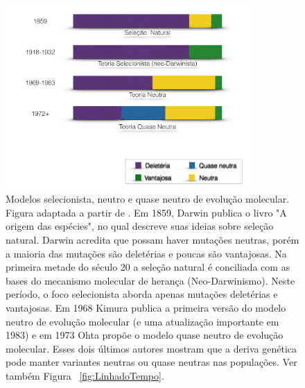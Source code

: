 \begin{refsection}
\begin{figure}[h]
\centering
\includegraphics[height=7cm,keepaspectratio]{chap1_folder/Figures/proportion_mutations.png}
\caption{Modelos selecionista, neutro e quase neutro de evolução molecular. Figura adaptada a partir de \textcite{Bromham2003,Bernardi2007}. Em 1859, Darwin publica o livro "A origem das espécies", no qual descreve suas ideias sobre seleção natural\nocite{Darwin1979}. Darwin acredita que possam haver mutações neutras,  porém a maioria das mutações são deletérias e poucas são vantajosas. Na primeira metade do século 20 a seleção natural é conciliada com as bases do mecanismo molecular de herança (Neo-Darwinismo). Neste período, o foco selecionista aborda apenas mutações deletérias e vantajosas. Em 1968 Kimura publica a primeira versão do modelo neutro de evolução molecular (e uma atualização importante em 1983) e em 1973 Ohta \nocite{Ohta1973SlightlyEvolution} propõe o modelo quase neutro de evolução molecular. Esses dois últimos autores mostram que a deriva genética pode manter variantes neutras ou quase neutras nas populações. Ver também Figura ~\ref{fig:LinhadoTempo}.} 
\label{fig:ProportionMutations}
\end{figure}

\end{refsection}
